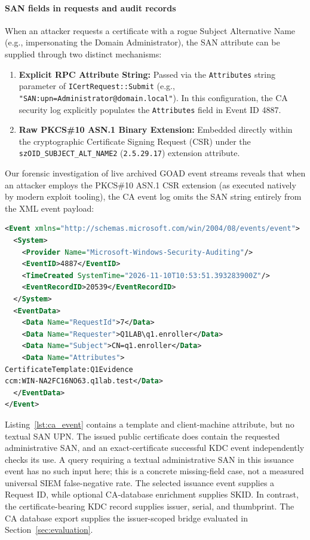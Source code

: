 \paragraph{SAN fields in requests and audit records}
When an attacker requests a certificate with a rogue Subject Alternative Name (e.g., impersonating the Domain Administrator), the SAN attribute can be supplied through two distinct mechanisms:
\begin{enumerate}
    \item \textbf{Explicit RPC Attribute String:} Passed via the \texttt{Attributes} string parameter of \texttt{ICertRequest::Submit} (e.g., \texttt{"SAN:upn=Administrator@domain.local"}). In this configuration, the CA security log explicitly populates the \texttt{Attributes} field in Event ID 4887.
    \item \textbf{Raw PKCS\#10 ASN.1 Binary Extension:} Embedded directly within the cryptographic Certificate Signing Request (CSR) under the \texttt{szOID\_SUBJECT\_ALT\_NAME2} (\texttt{2.5.29.17}) extension attribute.
\end{enumerate}

Our forensic investigation of live archived GOAD event streams reveals that when an attacker employs the PKCS\#10 ASN.1 CSR extension (as executed natively by modern exploit tooling), the CA event log omits the SAN string entirely from the XML event payload:
\begin{lstlisting}[language=XML,caption={Selected fields from the independent 2019 enabled-condition capture: Security record 20539. The raw XML is retained in the artifact.},label=lst:ca_event]
<Event xmlns="http://schemas.microsoft.com/win/2004/08/events/event">
  <System>
    <Provider Name="Microsoft-Windows-Security-Auditing"/>
    <EventID>4887</EventID>
    <TimeCreated SystemTime="2026-11-10T10:53:51.393283900Z"/>
    <EventRecordID>20539</EventRecordID>
  </System>
  <EventData>
    <Data Name="RequestId">7</Data>
    <Data Name="Requester">Q1LAB\q1.enroller</Data>
    <Data Name="Subject">CN=q1.enroller</Data>
    <Data Name="Attributes">
CertificateTemplate:Q1Evidence
ccm:WIN-NA2FC16NO63.q1lab.test</Data>
  </EventData>
</Event>
\end{lstlisting}

Listing~\ref{lst:ca_event} contains a template and client-machine attribute, but no textual SAN UPN. The issued public certificate does contain the requested administrative SAN, and an exact-certificate successful KDC event independently checks its use. A query requiring a textual administrative SAN in this issuance event has no such input here; this is a concrete missing-field case, not a measured universal SIEM false-negative rate. The selected issuance event supplies a Request ID, while optional CA-database enrichment supplies SKID. In contrast, the certificate-bearing KDC record supplies issuer, serial, and thumbprint. The CA database export supplies the issuer-scoped bridge evaluated in Section~\ref{sec:evaluation}.
